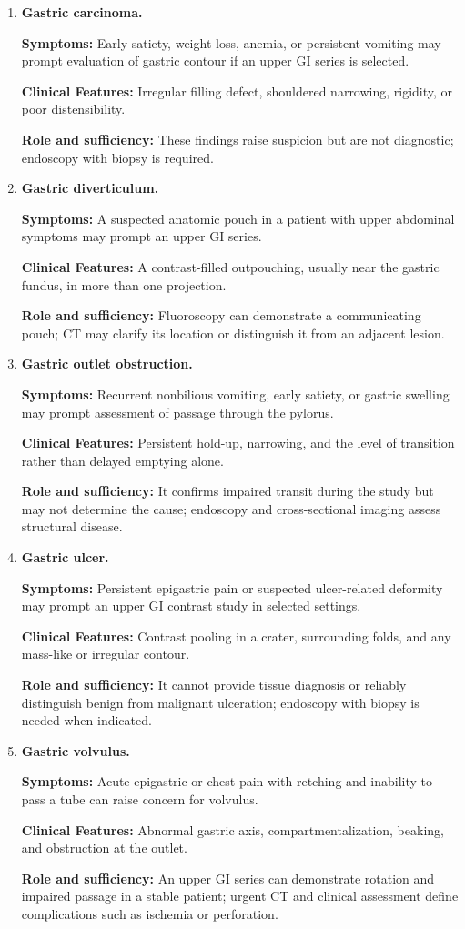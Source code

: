 \begin{enumerate}[leftmargin=*,itemsep=0.45em,topsep=0.4em]
\item \textbf{Gastric carcinoma.}\par\noindent\textbf{Symptoms:} Early satiety, weight loss, anemia, or persistent vomiting may prompt evaluation of gastric contour if an upper GI series is selected.\par\noindent\textbf{Clinical Features:} Irregular filling defect, shouldered narrowing, rigidity, or poor distensibility.\par\noindent\textbf{Role and sufficiency:} These findings raise suspicion but are not diagnostic; endoscopy with biopsy is required.
\item \textbf{Gastric diverticulum.}\par\noindent\textbf{Symptoms:} A suspected anatomic pouch in a patient with upper abdominal symptoms may prompt an upper GI series.\par\noindent\textbf{Clinical Features:} A contrast-filled outpouching, usually near the gastric fundus, in more than one projection.\par\noindent\textbf{Role and sufficiency:} Fluoroscopy can demonstrate a communicating pouch; CT may clarify its location or distinguish it from an adjacent lesion.
\item \textbf{Gastric outlet obstruction.}\par\noindent\textbf{Symptoms:} Recurrent nonbilious vomiting, early satiety, or gastric swelling may prompt assessment of passage through the pylorus.\par\noindent\textbf{Clinical Features:} Persistent hold-up, narrowing, and the level of transition rather than delayed emptying alone.\par\noindent\textbf{Role and sufficiency:} It confirms impaired transit during the study but may not determine the cause; endoscopy and cross-sectional imaging assess structural disease.
\item \textbf{Gastric ulcer.}\par\noindent\textbf{Symptoms:} Persistent epigastric pain or suspected ulcer-related deformity may prompt an upper GI contrast study in selected settings.\par\noindent\textbf{Clinical Features:} Contrast pooling in a crater, surrounding folds, and any mass-like or irregular contour.\par\noindent\textbf{Role and sufficiency:} It cannot provide tissue diagnosis or reliably distinguish benign from malignant ulceration; endoscopy with biopsy is needed when indicated.
\item \textbf{Gastric volvulus.}\par\noindent\textbf{Symptoms:} Acute epigastric or chest pain with retching and inability to pass a tube can raise concern for volvulus.\par\noindent\textbf{Clinical Features:} Abnormal gastric axis, compartmentalization, beaking, and obstruction at the outlet.\par\noindent\textbf{Role and sufficiency:} An upper GI series can demonstrate rotation and impaired passage in a stable patient; urgent CT and clinical assessment define complications such as ischemia or perforation.

\end{enumerate}
